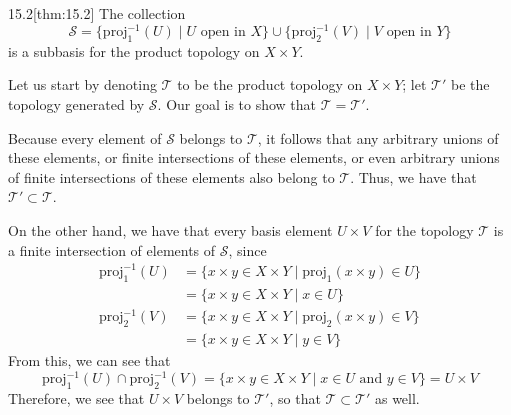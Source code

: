 \begin{thmBox}{15.2}[thm:15.2]
    The collection 
    \begin{equation*}
        \mathcal{S}
        =
        \{ \mathrm{proj}_{ 1 }^{ -1 } ( U ) \mid U \text{ open in } X \}
        \cup 
        \{ \mathrm{proj}_{ 2 }^{ -1 } ( V ) \mid V \text{ open in } Y \}
    \end{equation*}
    is a subbasis for the product topology on \( X \times Y \).

    \baseRule

    \begin{proofBox}
        Let us start by denoting \( \mathcal{T} \) to be the product topology 
        on \( X \times Y \); let \( \mathcal{T}' \) be the topology generated
        by \( \mathcal{S} \).
        Our goal is to show that \( \mathcal{T} = \mathcal{T}' \).

        \baseSkip

        Because every element of \( \mathcal{S} \) belongs to \( \mathcal{T} \),
        it follows that any arbitrary unions of these elements, or finite 
        intersections of these elements, or even arbitrary unions of finite
        intersections of these elements also belong to \( \mathcal{T} \).
        Thus, we have that \( \mathcal{T}' \subset \mathcal{T} \).

        \baseSkip

        On the other hand, we have that every basis element \( U \times V \)
        for the topology \( \mathcal{T} \) is a finite intersection of elements
        of \( \mathcal{S} \), since 
        \begin{equation*}
            \begin{aligned}
                \mathrm{proj}_{ 1 }^{ -1 } ( U )
                &=
                \{ x \times y \in X \times Y \mid 
                \mathrm{proj}_{ 1 } ( x \times y ) \in U \}
                \\
                &=
                \{ x \times y \in X \times Y \mid x \in U \}
                \\[5mm]
                \mathrm{proj}_{ 2 }^{ -1 } ( V )
                &=
                \{ x \times y \in X \times Y \mid 
                \mathrm{proj}_{ 2 } ( x \times y ) \in V \}
                \\
                &=
                \{ x \times y \in X \times Y \mid y \in V \}
            \end{aligned}
        \end{equation*}
        From this, we can see that 
        \begin{equation*}
            \mathrm{proj}_{ 1 }^{ -1 } ( U ) 
            \cap 
            \mathrm{proj}_{ 2 }^{ -1 } ( V )
            =
            \{ x \times y \in X \times Y \mid x \in U \text{ and } y \in V \}
            =
            U \times V
        \end{equation*}
        Therefore, we see that \( U \times V \) belongs to \( \mathcal{T}' \),
        so that \( \mathcal{T} \subset \mathcal{T}' \) as well.


\end{proofBox}
\end{thmBox}
